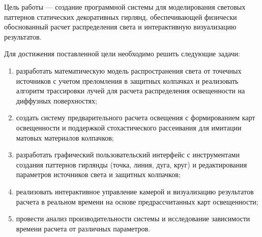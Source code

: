 
Цель работы --- создание программной системы для моделирования световых паттернов статических декоративных гирлянд, обеспечивающей физически обоснованный расчет распределения света и интерактивную визуализацию результатов.

Для достижения поставленной цели необходимо решить следующие задачи:

\begin{enumerate}
    \item разработать математическую модель распространения света от точечных источников с учетом преломления в защитных колпачках и реализовать алгоритм трассировки лучей для расчета распределения освещенности на диффузных поверхностях;
    \item создать систему предварительного расчета освещения с формированием карт освещенности и поддержкой стохастического рассеивания для имитации матовых материалов колпачков;
    \item разработать графический пользовательский интерфейс с инструментами создания паттернов гирлянды (точка, линия, дуга, круг) и редактирования параметров источников света и защитных колпачков;
    \item реализовать интерактивное управление камерой и визуализацию результатов расчета в реальном времени на основе предрассчитанных карт освещенности;
    \item провести анализ производительности системы и исследование зависимости времени расчета от различных параметров.
\end{enumerate}

\clearpage
